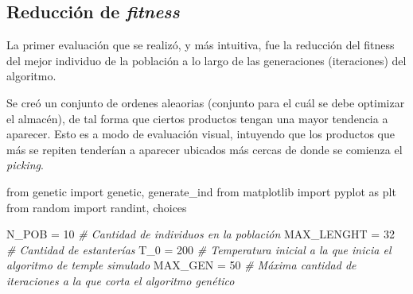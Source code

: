 \documentclass[
]{article}
\newenvironment{Shaded}{}{}
\newcommand{\CommentTok}[1]{\textcolor[rgb]{0.38,0.63,0.69}{\textit{#1}}}
\newcommand{\DecValTok}[1]{\textcolor[rgb]{0.25,0.63,0.44}{#1}}
\newcommand{\ImportTok}[1]{#1}
\newcommand{\NormalTok}[1]{#1}
\newcommand{\OperatorTok}[1]{\textcolor[rgb]{0.40,0.40,0.40}{#1}}
\begin{document}
\hypertarget{reducciuxf3n-de-fitness}{%
\subsection{\texorpdfstring{Reducción de
\emph{fitness}}{Reducción de fitness}}\label{reducciuxf3n-de-fitness}}

La primer evaluación que se realizó, y más intuitiva, fue la reducción
del fitness del mejor individuo de la población a lo largo de las
generaciones (iteraciones) del algoritmo.

Se creó un conjunto de ordenes aleaorias (conjunto para el cuál se debe
optimizar el almacén), de tal forma que ciertos productos tengan una
mayor tendencia a aparecer. Esto es a modo de evaluación visual,
intuyendo que los productos que más se repiten tenderían a aparecer
ubicados más cercas de donde se comienza el \emph{picking}.

\begin{Shaded}
\begin{Highlighting}[]
\ImportTok{from}\NormalTok{ genetic }\ImportTok{import}\NormalTok{ genetic, generate_ind}
\ImportTok{from}\NormalTok{ matplotlib }\ImportTok{import}\NormalTok{ pyplot }\ImportTok{as}\NormalTok{ plt}
\ImportTok{from}\NormalTok{ random }\ImportTok{import}\NormalTok{ randint, choices}

\NormalTok{N_POB }\OperatorTok{=} \DecValTok{10} \CommentTok{# Cantidad de individuos en la población}
\NormalTok{MAX_LENGHT }\OperatorTok{=} \DecValTok{32} \CommentTok{# Cantidad de estanterías}
\NormalTok{T_0 }\OperatorTok{=} \DecValTok{200} \CommentTok{# Temperatura inicial a la que inicia el algoritmo de temple simulado}
\NormalTok{MAX_GEN }\OperatorTok{=} \DecValTok{50} \CommentTok{# Máxima cantidad de iteraciones a la que corta el algoritmo genético}
\end{Highlighting}
\end{Shaded}
\end{document}
